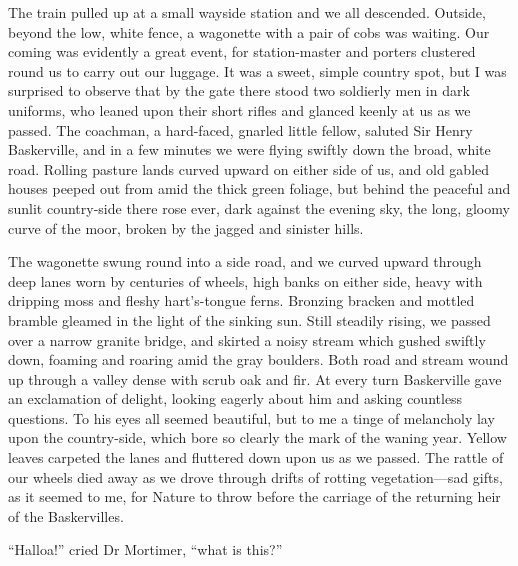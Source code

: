 \documentclass[paper=5.5in:8.5in,BCOR=7mm,twoside,DIV=calc,12pt,usegeometry,openany,chapterprefix,endperiod]{scrbook} %
\begin{document}
The train pulled up at a small wayside station and we all descended. Outside, beyond the low, white fence, a wagonette with a pair of cobs was waiting. Our coming was evidently a great event, for station-master and porters clustered round us to carry out our luggage. It was a sweet, simple country spot, but I was surprised to observe that by the gate there stood two soldierly men in dark uniforms, who leaned upon their short rifles and glanced keenly at us as we passed. The coachman, a hard-faced, gnarled little fellow, saluted Sir Henry Baskerville, and in a few minutes we were flying swiftly down the broad, white road. Rolling pasture lands curved upward on either side of us, and old gabled houses peeped out from amid the thick green foliage, but behind the peaceful and sunlit country-side there rose ever, dark against the evening sky, the long, gloomy curve of the moor, broken by the jagged and sinister hills.

The wagonette swung round into a side road, and we curved upward through deep lanes worn by centuries of wheels, high banks on either side, heavy with dripping moss and fleshy hart's-tongue ferns. Bronzing bracken and mottled bramble gleamed in the light of the sinking sun. Still steadily rising, we passed over a narrow granite bridge, and skirted a noisy stream which gushed swiftly down, foaming and roaring amid the gray boulders. Both road and stream wound up through a valley dense with scrub oak and fir. At every turn Baskerville gave an exclamation of delight, looking eagerly about him and asking countless questions. To his eyes all seemed beautiful, but to me a tinge of melancholy lay upon the country-side, which bore so clearly the mark of the waning year. Yellow leaves carpeted the lanes and fluttered down upon us as we passed. The rattle of our wheels died away as we drove through drifts of rotting vegetation\nobreakdash---sad gifts, as it seemed to me, for Nature to throw before the carriage of the returning heir of the Baskervilles.

\enquote{Halloa!} cried Dr Mortimer, \enquote{what is this?}
\end{document}

